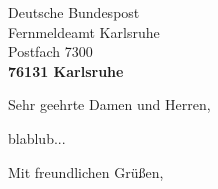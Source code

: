 \documentclass[12pt]{dinbrief}
\begin{document}
\begin{letter}{Deutsche Bundespost\\
               Fernmeldeamt Karlsruhe\\
               Postfach 7300\\[\medskipamount]
               {\bf 76131 Karlsruhe}}
\subject{Betreff}
\opening{Sehr geehrte Damen und Herren,}

blablub...

\closing{Mit freundlichen Grüßen,}


\end{letter}
\end{document}

